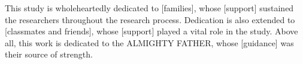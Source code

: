 This study is wholeheartedly dedicated to [families], whose [support] sustained the researchers throughout the research process. Dedication is also extended to [classmates and friends], whose [support] played a vital role in the study. Above all, this work is dedicated to the ALMIGHTY FATHER, whose [guidance] was their source of strength.
